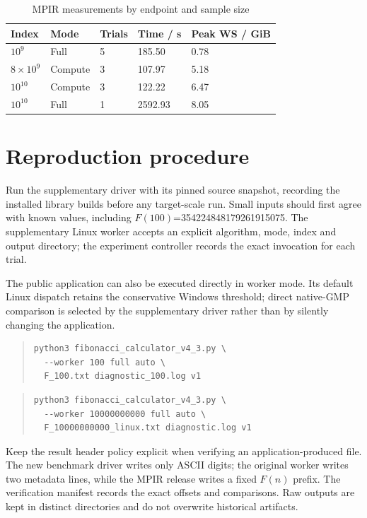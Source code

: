 \documentclass[11pt,a4paper]{article}
\begin{document}
\begin{table}[htbp]
\centering\small
\caption{MPIR measurements by endpoint and sample size}
\begin{tabularx}{\linewidth}{lXXXX}
\toprule
Index & Mode & Trials & Time / s & Peak WS / GiB \\
\midrule
$10^{9}$ & Full & 5 & 185.50 & 0.78 \\
$8\times 10^{9}$ & Compute & 3 & 107.97 & 5.18 \\
$10^{10}$ & Compute & 3 & 122.22 & 6.47 \\
$10^{10}$ & Full & 1 & 2592.93 & 8.05 \\
\bottomrule
\end{tabularx}
\end{table}

\section{Reproduction procedure}

Run the supplementary driver with its pinned source snapshot, recording the installed library builds before any target-scale run. Small inputs should first agree with known values, including $F(100)$=354224848179261915075. The supplementary Linux worker accepts an explicit algorithm, mode, index and output directory; the experiment controller records the exact invocation for each trial.

The public application can also be executed directly in worker mode. Its default Linux dispatch retains the conservative Windows threshold; direct native-GMP comparison is selected by the supplementary driver rather than by silently changing the application.

\begin{quote}\footnotesize
\begin{verbatim}
python3 fibonacci_calculator_v4_3.py \
  --worker 100 full auto \
  F_100.txt diagnostic_100.log v1
\end{verbatim}
\end{quote}

\begin{quote}\footnotesize
\begin{verbatim}
python3 fibonacci_calculator_v4_3.py \
  --worker 10000000000 full auto \
  F_10000000000_linux.txt diagnostic.log v1
\end{verbatim}
\end{quote}

Keep the result header policy explicit when verifying an application-produced file. The new benchmark driver writes only ASCII digits; the original worker writes two metadata lines, while the MPIR release writes a fixed $F(n)$ prefix. The verification manifest records the exact offsets and comparisons. Raw outputs are kept in distinct directories and do not overwrite historical artifacts.
\end{document}
